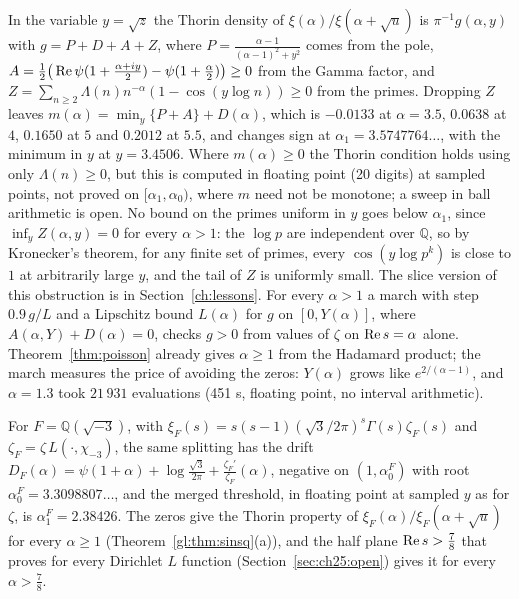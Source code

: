 \begin{remark}\label{tx2:rem:alpha1}
In the variable $y=\sqrt z$ the Thorin density of $\xi(\alpha)/\xi(\alpha+\sqrt u)$ is $\pi^{-1}g(\alpha,y)$ with $g=P+D+A+Z$, where $P=\frac{\alpha-1}{(\alpha-1)^2+y^2}$ comes from the pole, $A=\frac12\big(\operatorname{Re}\psi(1+\frac{\alpha+iy}2)-\psi(1+\frac\alpha2)\big)\ge0$ from the Gamma factor, and $Z=\sum_{n\ge2}\Lambda(n)n^{-\alpha}(1-\cos(y\log n))\ge0$ from the primes. Dropping $Z$ leaves $m(\alpha)=\min_y\{P+A\}+D(\alpha)$, which is $-0.0133$ at $\alpha=3.5$, $0.0638$ at $4$, $0.1650$ at $5$ and $0.2012$ at $5.5$, and changes sign at $\alpha_1=3.5747764\ldots$, with the minimum in $y$ at $y=3.4506$. Where $m(\alpha)\ge0$ the Thorin condition holds using only $\Lambda(n)\ge0$, but this is computed in floating point (20 digits) at sampled points, not proved on $[\alpha_1,\alpha_0)$, where $m$ need not be monotone; a sweep in ball arithmetic is open. No bound on the primes uniform in $y$ goes below $\alpha_1$, since $\inf_yZ(\alpha,y)=0$ for every $\alpha>1$: the $\log p$ are independent over $\mathbb Q$, so by Kronecker's theorem, for any finite set of primes, every $\cos(y\log p^k)$ is close to $1$ at arbitrarily large $y$, and the tail of $Z$ is uniformly small. The slice version of this obstruction is in Section~\ref{ch:lessons}. For every $\alpha>1$ a march with step $0.9\,g/L$ and a Lipschitz bound $L(\alpha)$ for $g$ on $[0,Y(\alpha)]$, where $A(\alpha,Y)+D(\alpha)=0$, checks $g>0$ from values of $\zeta$ on $\operatorname{Re} s=\alpha$ alone. Theorem~\ref{thm:poisson} already gives $\alpha\ge1$ from the Hadamard product; the march measures the price of avoiding the zeros: $Y(\alpha)$ grows like $e^{2/(\alpha-1)}$, and $\alpha=1.3$ took $21\,931$ evaluations (451 s, floating point, no interval arithmetic).
\end{remark}

For $F=\mathbb Q(\sqrt{-3})$, with $\xi_F(s)=s(s-1)(\sqrt3/2\pi)^s\Gamma(s)\zeta_F(s)$ and $\zeta_F=\zeta\,L(\cdot,\chi_{-3})$, the same splitting has the drift $D_F(\alpha)=\psi(1+\alpha)+\log\frac{\sqrt3}{2\pi}+\frac{\zeta_F'}{\zeta_F}(\alpha)$, negative on $(1,\alpha_0^F)$ with root $\alpha_0^F=3.3098807\ldots$, and the merged threshold, in floating point at sampled $y$ as for $\zeta$, is $\alpha_1^F=2.38426$. The zeros give the Thorin property of $\xi_F(\alpha)/\xi_F(\alpha+\sqrt u)$ for every $\alpha\ge1$ (Theorem~\ref{gl:thm:sinsq}(a)), and the half plane $\operatorname{Re} s>\frac78$ that \cite{OAI26a} proves for every Dirichlet $L$ function (Section~\ref{sec:ch25:open}) gives it for every $\alpha>\frac78$.

